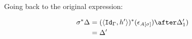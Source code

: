 {Going back to the original expression:

\begin{align}
    \si\star{\D} & = (\pr{\Id{\G}}{h'})\star(\e_{A\ssi})\after\D_1')\\
    & = \D'\\
\end{align}
}

\newcommand\effectWeakeningEffects[0]{
    If $\w = \deno{\wrelw{\P'}{\P}}$ then $\typerelation{\P'}{\e}{\effect} = \w\star\deno{\typerelation{\P}{\e}{\effect}} = \deno{\typerelation{\P}{\e}{\effect}}\after\w$

\proof
By induction on the derivation on $\deno{\typerelation{\P}{\e}{\effect}}$

\case{Ground}
\begin{align}
    \deno{\typerelation{\P}{e}{\effect}}\after\w & = \deno{e}\after\term{I}\after\w \\
    & = \deno{e}\after\term{I'} \\
    & = \deno{\typerelation{\P'}{e}{\type}}\\
\end{align}

\case{Var}
Case split on $\w$.
\subcase{$\w = \i$}
Then $\P' = \P$ and $\w = \Id{I}$. So the theorem holds trivially.
\subcase{$\w = \w'\x$}
Then

\begin{align}
    \deno{\typerelation{\P,\a}{\a}{\effect}}\after\w &= \pp\after(\w'\times \Id{U}) \\
    & = \pp\\
    & = \deno{\typerelation{\P',\a}{\a}{\effect}}
\end{align}

\subcase{$\w = \w'\p$}
Then \begin{equation}
    \deno{\typerelation{\P,\a}{\a}{\effect}} = \pp\after\w'\after\p
\end{equation}

Where $\P' = \P,\b$ and $\wrel{\w'}{\P''}{\P}$.

So\begin{align}
    \pp\after\w' & = \deno{\typerelation{\P''}{\a}{\effect}}
    \\
    \pp\after\w'\after\p & =\deno{\typerelation{\P'',\b}{\a}{\effect}}
    &= \deno{\typerelation{\P'}{\a}{\effect}}
\end{align}

\case{Weaken}
\begin{equation}
    \deno{\typerelation{\P,\b}{\a}{\effect}}\after\w = \deno{\typerelation{\P}{\a}{\effect}}\after\p\after\w
\end{equation}

}
